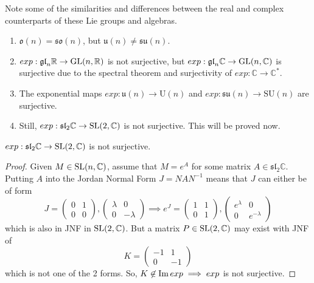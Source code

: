     Note some of the similarities and differences between the real and complex counterparts of these Lie groups and algebras. 
    \begin{enumerate}
      \item $\mathfrak{o}(n) = \mathfrak{so}(n)$, but $\mathfrak{u}(n) \neq \mathfrak{su}(n)$. 
      \item $exp: \mathfrak{gl}_n \mathbb{R} \rightarrow \GL(n, \mathbb{R})$ is not surjective, but $exp: \mathfrak{gl}_n \mathbb{C} \rightarrow \GL(n, \mathbb{C})$ is surjective due to the spectral theorem and surjectivity of $exp: \mathbb{C} \rightarrow \mathbb{C}^*$.
      \item The exponential maps $exp: \mathfrak{u}(n) \rightarrow \text{U}(n)$ and $exp: \mathfrak{su}(n) \rightarrow \text{SU}(n)$ are surjective. 
      \item Still, $exp: \mathfrak{sl}_2 \mathbb{C} \rightarrow \SL(2, \mathbb{C})$ is not surjective. This will be proved now. 
    \end{enumerate}

    \begin{theorem}
      $exp: \mathfrak{sl}_2 \mathbb{C} \rightarrow \SL(2, \mathbb{C})$ is not surjective. 
    \end{theorem}
    \begin{proof}
      Given $M \in \SL(n, \mathbb{C})$, assume that $M = e^A$ for some matrix $A \in \mathfrak{sl}_2 \mathbb{C}$. Putting $A$ into the Jordan Normal Form $J = N A N^{-1}$ means that $J$ can either be of form
      \begin{equation}
        J = \begin{pmatrix}
        0&1\\0&0
        \end{pmatrix}, \begin{pmatrix}
        \lambda&0\\0&-\lambda
        \end{pmatrix} \implies e^J = \begin{pmatrix}
        1&1\\0&1
        \end{pmatrix}, \begin{pmatrix}
        e^\lambda&0\\0&e^{-\lambda}
        \end{pmatrix}
      \end{equation}
      which is also in JNF in $\SL(2, \mathbb{C})$. But a matrix $P \in \SL(2, \mathbb{C})$ may exist with JNF of 
      \begin{equation}
        K = \begin{pmatrix}
        -1&1\\0&-1
        \end{pmatrix}
      \end{equation}
      which is not one of the 2 forms. So, $K \not\in \im{exp} \implies exp$ is not surjective. 
    \end{proof}

